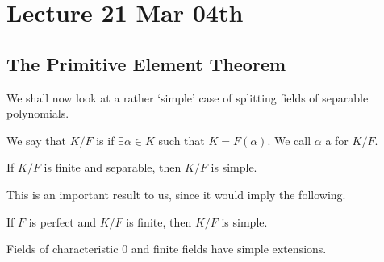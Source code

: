 \documentclass[notoc,notitlepage,nobib]{tufte-book}
\begin{document}


\chapter{Lecture 21 Mar 04th}%
\label{chp:lecture_21_mar_04th}

\section{The Primitive Element Theorem}%
\label{sec:the_primitive_element_theorem}

We shall now look at a rather `simple' case of splitting fields of separable
polynomials.

\begin{defn}\label{defn:simple_extension_and_primitive_elements}
  We say that $K / F$ is  if $\exists \alpha \in K$ such that $K
  = F(\alpha)$. We call $\alpha$ a  for $K / F$.
\end{defn}

\begin{thm}\label{thm:primitive_element_theorem}
  If $K / F$ is finite and
  \hyperref[defn:separable_elements_and_separable_extensions]{separable}, then
  $K / F$ is simple.
\end{thm}

This is an important result to us, since it would imply the following.

\begin{crly}\label{crly:finite_extensions_of_perfect_fields_are_simple}
  If $F$ is perfect and $K / F$ is finite, then $K / F$ is simple.
\end{crly}

\begin{eg}
  Fields of characteristic $0$ and finite fields have simple extensions.
\end{eg}
\end{document}
